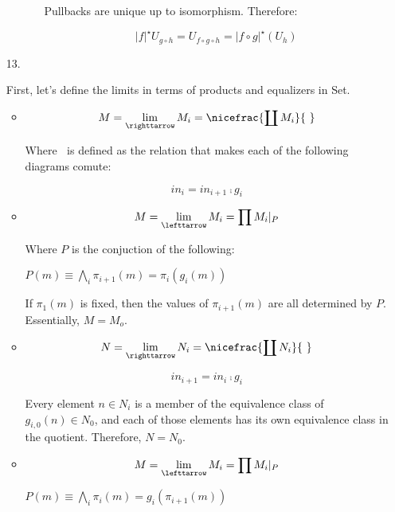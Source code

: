 \documentclass{article}
\begin{document}
\begin{enumerate}
\begin{itemize}
\begin{itemize}
          Pullbacks are unique up to isomorphism. Therefore:

          $$ \vert f \vert^\star U_{g\circ h} = U_{f \circ g \circ h} = \vert f \circ g \vert^\star (U_h)$$

        \end{itemize}
        
   \end{itemize}

   \item[13.]

     First, let's define the limits in terms of products and equalizers
     in Set.

     \begin{itemize}
       \item
         
         $$M = \lim_{\righttarrow} M_i = \nicefrac{\coprod M_i}{~}$$

         Where $~$ is defined as the relation that makes each of the
         following diagrams comute:

         $$ in_i = in_{i+1} \comp g_i$$


       \item
         
         
         $$M = \lim_{\lefttarrow} M_i = {\prod M_i} \vert_P$$

         Where $P$ is the conjuction of the following:

         $P(m) \equiv \bigwedge_i \pi_{i+1}(m) = \pi_{i}( g_{i}(m) )$

         If $\pi_1(m)$ is fixed, then the values of $\pi_{i+1}(m)$ are
         all determined by $P$. Essentially, $M = M_o$.

       \item

         $$N = \lim_{\righttarrow} N_i = \nicefrac{\coprod N_i}{~}$$

         $$ in_{i+1} = in_{i} \comp g_i$$
         
         Every element $n \in N_i$ is a member of the equivalence
         class of $g_{i,0}(n) \in N_0$, and each of those elements
         has its own equivalence class in the quotient.
         Therefore, $N = N_0$.

       \item  

         $$M = \lim_{\lefttarrow} M_i = {\prod M_i} \vert_P$$
         
         $P(m) \equiv \bigwedge_i \pi_{i}(m) = g_{i}(\pi_{i+1}(m) )$


\end{itemize}
\end{enumerate}
\end{document}
